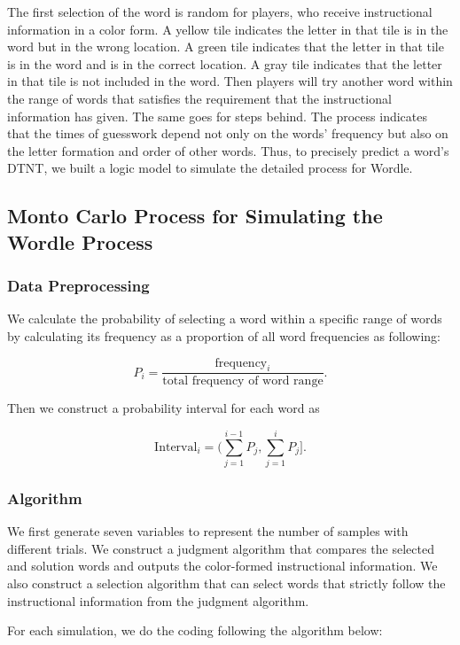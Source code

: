 \documentclass[12pt]{article}
\begin{document}
The first selection of the word is random for players, who receive instructional information in a color form. A yellow tile indicates the letter in that tile is in the word but in the wrong location. A green tile indicates that the letter in that tile is in the word and is in the correct location. A gray tile indicates that the letter in that tile is not included in the word. Then players will try another word within the range of words that satisfies the requirement that the instructional information has given. The same goes for steps behind. The process indicates that the times of guesswork depend not only on the words’ frequency but also on the letter formation and order of other words. Thus, to precisely predict a word’s DTNT, we built a logic model to simulate the detailed process for Wordle.

\subsection{Monto Carlo Process for Simulating the Wordle Process}

\subsubsection{Data Preprocessing}

We calculate the probability of selecting a word within a specific range of words by calculating its frequency as a proportion of all word frequencies as following:

$$
P_i=\frac{\text{frequency}_i}{\text{total frequency of word range}} \text{.}
$$

\vspace{0.3cm}
\noindent
Then we construct a probability interval for each word as

$$
\text{Interval}_i=(\sum^{i-1}_{j=1}P_j,\sum^{i}_{j=1}P_j].
$$

\subsubsection{Algorithm}

We first generate seven variables to represent the number of samples with different trials. We construct a judgment algorithm that compares the selected and solution words and outputs the color-formed instructional information. We also construct a selection algorithm that can select words that strictly follow the instructional information from the judgment algorithm.

\vspace{0.3cm}
\noindent
For each simulation, we do the coding following the algorithm below:
\end{document}
